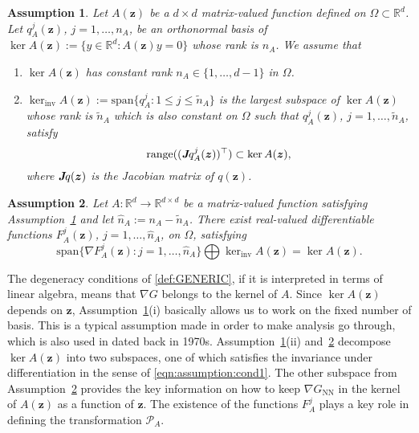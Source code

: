\documentclass[openacc]{rsproca_new}%
\newcommand{\z}{\bm{z}}
\newtheorem{assumption}{Assumption}
\begin{document}
\begin{assumption} \label{assumption1}
    Let $A(\z)$ be a $d\times d$ matrix-valued function defined on $\Omega \subset \mathbb{R}^d$.
    Let $q^j_{A}(\z)$, $j=1,\dots,n_A$,
    be an orthonormal basis of $\ker A(\z) := \{y \in \mathbb{R}^d : A(\z)y = 0\}$
    whose rank is $n_A$.
    We assume that 
    \begin{enumerate}
        \item $\ker A(\z)$ has constant rank
        $n_A \in \{1,\dots,d-1\}$
        in $\Omega$.
        \item 
        $\ker_{\text{inv}} A(\z):=\text{span}\{q_A^j:1\le j \le \tilde{n}_A\}$
        is 
        the largest subspace of $\ker A(\z)$
        whose rank is $\tilde{n}_A$
        which is also constant on $\Omega$
        such that  
        $q_A^j(\z)$, $j=1,\dots,\tilde{n}_A$,
        satisfy 
        \begin{equation} \label{eqn:assumption:cond1}
            \text{range}((\emph{\textbf{J}}q^j_{A}(\z))^\top) \subset \ker A(\z),
        \end{equation}
        where $\emph{\textbf{J}}q(\z)$ is the Jacobian matrix of $q(\z)$.
    \end{enumerate}
\end{assumption}

\begin{assumption} \label{assumption2}
    Let $A:\mathbb{R}^d \to \mathbb{R}^{d\times d}$ be a matrix-valued function
    satisfying Assumption~\ref{assumption1}
    and let $\hat{n}_A := n_A - \tilde{n}_A$.
    There exist
    real-valued differentiable functions $F^j_A(\z)$, $j=1,\dots,\hat{n}_{A}$,  on $\Omega$,
    satisfying 
    \begin{equation}
        \text{span}\{\nabla F_A^j(\z): j=1,\dots,\hat{n}_{A}\}
        \bigoplus
        \ker_{\text{inv}} A(\z)
        = \ker A(\z).
    \end{equation}
\end{assumption}

The degeneracy conditions of \eqref{def:GENERIC},
if it is interpreted in terms of linear algebra,
means that 
$\nabla G$ belongs to the kernel of $A$.
Since $\ker A(\z)$ depends on $\z$,
Assumption~\ref{assumption1}(i)
basically allows us to work on the fixed number of basis. 
This is a typical assumption made in order 
to make analysis go through, which is also used in \cite{golub1973differentiation} dated back in 1970s. 
Assumption~\ref{assumption1}(ii) and~\ref{assumption2} 
decompose $\ker A(\z)$
into two subspaces, one of which satisfies 
the invariance under differentiation 
in the sense of \eqref{eqn:assumption:cond1}.
The other subspace from Assumption~\ref{assumption2}
provides the key information on 
how to keep $\nabla G_{\text{NN}}$ in the kernel of $A(\z)$
as a function of $\z$.
The existence of the functions $F_A^j$
plays a key role in defining the transformation
$\mathcal{P}_A$. 
\end{document}
